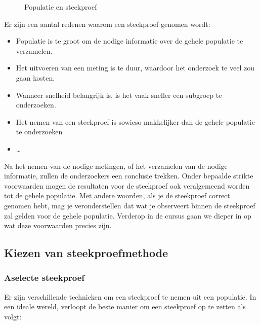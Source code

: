 \begin{figure}
  \begin{center}
  \end{center}
  \caption{Populatie en steekproef}
  \label{img:populatie-steekproef}
\end{figure}

Er zijn een aantal redenen waarom een steekproef genomen wordt:

\begin{itemize}
  \item Populatie is te groot om de nodige informatie over de gehele populatie te verzamelen.
  \item Het uitvoeren van een meting is te duur, waardoor het onderzoek te veel zou gaan kosten.
  \item Wanneer snelheid belangrijk is, is het vaak sneller een subgroep te onderzoeken.
  \item Het nemen van een steekproef is sowieso makkelijker dan de gehele populatie te onderzoeken
  \item \dots
\end{itemize}

Na het nemen van de nodige metingen, of het verzamelen van de nodige informatie, zullen de onderzoekers een conclusie trekken. Onder bepaalde strikte voorwaarden mogen de resultaten voor de steekproef ook veralgemeend worden tot de gehele populatie. Met andere woorden, als je de steekproef correct genomen hebt, mag je veronderstellen dat wat je observeert binnen de steekproef zal gelden voor de gehele populatie. Verderop in de cursus gaan we dieper in op wat deze voorwaarden precies zijn.

\subsection{Kiezen van steekproefmethode}

\subsubsection{Aselecte steekproef}

Er zijn verschillende technieken om een steekproef te nemen uit een populatie. In een ideale wereld, verloopt de beste manier om een steekproef op te zetten als volgt:

